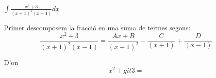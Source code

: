 \Exercise[title={$\int \frac{P(x)}{Q(x)}$, amb denominador amb arrels reals}]


  $\int \frac{x^2+3}{(x+1)^2(x-1)} dx$
  

\Answer


  Primer descomposem la fracció en una suma de termes segons:
  \[
    \frac{x^2+3}{(x+1)^2(x-1)}=\frac{Ax+B}{(x+1)^2}+\frac{C}{(x+1)}+\frac{D}{(x-1)}
    \]

  D'on 
  \[
    x^2+git3=
  \]
  
\blacksquare


